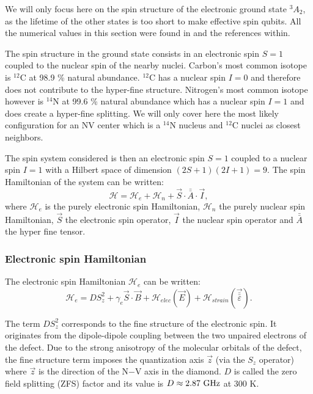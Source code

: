 \documentclass[a4paper, 11pt]{report}
\begin{document}
We will only focus here on the spin structure of the electronic ground state $^3A_2$, as the lifetime of the other states is too short to make effective spin qubits. All the numerical values in this section were found in \citep{smeltzer2009robust, doherty2013nitrogen} and the references within.

The spin structure in the ground state consists in an electronic spin $S=1$ coupled to the nuclear spin of the nearby nuclei. Carbon's most common isotope is $^{12}$C at 98.9 \% natural abundance. $^{12}$C has a nuclear spin $I=0$ and therefore does not contribute to the hyper-fine structure. Nitrogen's most common isotope however is $^{14}$N at 99.6 \% natural abundance which has a nuclear spin $I=1$ and does create a hyper-fine splitting. We will only cover here the most likely configuration for an NV center which is a $^{14}$N nucleus and $^{12}$C nuclei as closest neighbors. 

The spin system considered is then an electronic spin $S=1$ coupled to a nuclear spin $I=1$ with a Hilbert space of dimension $(2S+1)(2I+1)=9$. The spin Hamiltonian of the system can be written:
\begin{equation}
\mathcal{H}=\mathcal{H}_e + \mathcal{H}_n + \vec{S}\cdot \bar{\bar{A}}\cdot \vec{I},
\end{equation}
where $\mathcal{H}_e$ is the purely electronic spin Hamiltonian, $\mathcal{H}_n$ the purely nuclear spin Hamiltonian, $\vec{S}$ the electronic spin operator, $\vec{I}$ the nuclear spin operator and $\bar{\bar{A}}$ the hyper fine tensor.
\subsubsection{Electronic spin Hamiltonian}
The electronic spin Hamiltonian $\mathcal{H}_e$ can be written:
\begin{equation}
\label{eq. spin elec}
\mathcal{H}_e=D S_z^2 + \gamma_e \vec{S} \cdot \vec{B} + \mathcal{H}_{elec}(\vec{E})+ \mathcal{H}_{strain}(\vec{\bar{\bar{\varepsilon}}}).
\end{equation}

The term $D S_z^2$ corresponds to the fine structure of the electronic spin. It originates from the dipole-dipole coupling between the two unpaired electrons of the defect. Due to the strong anisotropy of the molecular orbitals of the defect, the fine structure term imposes the quantization axis $\vec{z}$ (via the $S_z$ operator) where $\vec{z}$ is the direction of the N$-$V axis in the diamond. $D$ is called the zero field splitting (ZFS) factor and its value is $D\approx 2.87\ \rm GHz$ at 300 K.
\end{document}
